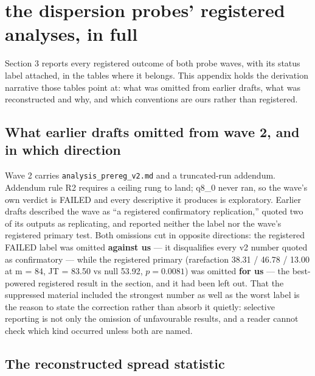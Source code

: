\section{the dispersion probes' registered analyses, in full}

Section 3 reports every registered outcome of both probe waves, with its status label attached, in the tables where it belongs. This appendix holds the derivation narrative those tables point at: what was omitted from earlier drafts, what was reconstructed and why, and which conventions are ours rather than registered.

\subsection{What earlier drafts omitted from wave 2, and in which direction}

Wave 2 carries \texttt{analysis\_prereg\_v2.md} and a truncated-run addendum. Addendum rule R2 requires a ceiling rung to land; q8\_0 never ran, so the wave's own verdict is FAILED and every descriptive it produces is exploratory. Earlier drafts described the wave as ``a registered confirmatory replication,'' quoted two of its outputs as replicating, and reported neither the label nor the wave's registered primary test. Both omissions cut in opposite directions: the registered FAILED label was omitted \textbf{against us} --- it disqualifies every v2 number quoted as confirmatory --- while the registered primary (rarefaction 38.31 / 46.78 / 13.00 at m = 84, JT = 83.50 vs null 53.92, $p = 0.0081$) was omitted \textbf{for us} --- the best-powered registered result in the section, and it had been left out. That the suppressed material included the strongest number as well as the worst label is the reason to state the correction rather than absorb it quietly: selective reporting is not only the omission of unfavourable results, and a reader cannot check which kind occurred unless both are named.

\subsection{The reconstructed spread statistic}

